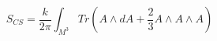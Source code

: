 \begin{equation}
S_{CS}=\frac{k}{2\pi }\int_{M^{3}}Tr(A\wedge dA+\frac{2}{3}A\wedge A\wedge A)
\label{32}
\end{equation}

